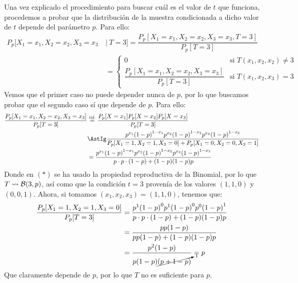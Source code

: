 \begin{ejercicio}
    Una vez explicado el procedimiento para buscar cuál es el valor de $t$ que funciona, procedemos a probar que la distribución de la muestra condicionada a dicho valor de $t$ depende del parámetro $p$. Para ello:
            \begin{align*}
                P_p[X_1 = x_1, X_2=x_2, X_3 = x_3 \ &|\ T=3] = \dfrac{P_p[X_1=x_1, X_2=x_2, X_3 = x_3, T=3]}{P_p[T=3]} \\
                                                           &= \left\{\begin{array}{ll}
                                                               0 & \text{si\ } T(x_1,x_2,x_2)\neq 3 \\
                                                               \dfrac{P_p[X_1=x_1, X_2=x_2, X_3=x_3]}{P_p[T=3]}& \text{si\ } T(x_1,x_2,x_3) = 3
                                                           \end{array}\right. 
            \end{align*}
            Vemos que el primer caso no puede depender nunca de $p$, por lo que buscamos probar que el segundo caso sí que depende de $p$. Para ello:
            \begin{align*}
                \dfrac{P_p[X_1=x_1, X_2=x_2, X_3=x_3]}{P_p[T=3]} &\stackrel{\text{iid.}}{=} \dfrac{P_p[X=x_1]P_p[X=x_2]P_p[X=x_3]}{P_p[T=3]} \\
                                                                 &\AstIg \dfrac{p^{x_1}{(1-p)}^{1-x_1} p^{x_2}{(1-p)}^{1-x_2}p^{x_3}{(1-p)}^{1-x_3}}{P_p[X_1=1,X_2=1,X_3=0]+P_p[X_1=0,X_2=0,X_3=1]} \\
                                                                 &= \dfrac{p^{x_1}{(1-p)}^{1-x_1} p^{x_2}{(1-p)}^{1-x_2}p^{x_3}{(1-p)}^{1-x_3}}{p\cdot p\cdot (1-p) + (1-p)(1-p)p} \\
            \end{align*}
            Donde en $(\ast)$ se ha usado la propiedad reproductiva de la Binomial, por lo que $T\rightsquigarrow \mathcal{B}(3,p)$, así como que la condición $t=3$ provenía de los valores $(1,1,0)$ y $(0,0,1)$.
            Ahora, si tomamos $(x_1,x_2,x_3) = (1,1,0)$, tenemos que:
            \begin{align*}
                \dfrac{P_p[X_1=1, X_2=1, X_3=0]}{P_p[T=3]} &= \dfrac{p^{1}{(1-p)}^{0} p^{1}{(1-p)}^{0}p^{0}{(1-p)}^{1}}{p\cdot p\cdot (1-p) + (1-p)(1-p)p} \\
                                                                 &= \dfrac{pp(1-p)}{pp(1-p)+(1-p)(1-p)p} \\
                                                                 &= \dfrac{p^2(1-p)}{p(1-p)\cancelto{1}{(p+1-p)}} = p
            \end{align*}
            Que claramente depende de $p$, por lo que $T$ no es suficiente para $p$.
\end{ejercicio}

